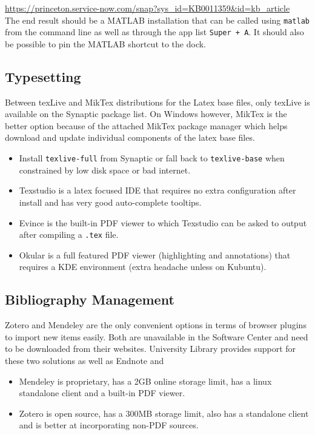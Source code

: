 \documentclass[10pt,letterpaper,twocolumn]{article}
\begin{document}
\url{https://princeton.service-now.com/snap?sys_id=KB0011359&id=kb_article}\\

The end result should be a MATLAB installation that can be called using \texttt{matlab} from the command line as well as through the app list \texttt{Super + A}. It should also be possible to pin the MATLAB shortcut to the dock.

\subsection{Typesetting}

Between texLive and MikTex distributions for the Latex base files, only texLive is available on the Synaptic package list. On Windows however, MikTex is the better option because of the attached MikTex package manager which helps download and update individual components of the latex base files.

\begin{itemize}
	\item Install \texttt{texlive-full} from Synaptic or fall back to \texttt{texlive-base} when constrained by low disk space or bad internet.
	\item Texstudio is a latex focused IDE that requires no extra configuration after install and has very good auto-complete tooltips.
	\item Evince is the built-in PDF viewer to which Texstudio can be asked to output after compiling a \texttt{.tex} file. 
	\item Okular is a full featured PDF viewer (highlighting and annotations) that requires a KDE environment (extra headache unless on Kubuntu).
\end{itemize} 


\subsection{Bibliography Management}

Zotero and Mendeley are the only convenient options in terms of browser plugins to import new items easily. Both are unavailable in the Software Center and need to be downloaded from their websites. University Library provides support for these two solutions as well as Endnote and 

\begin{itemize}
	\item Mendeley is proprietary, has a 2GB online storage limit, has a linux standalone client and a built-in PDF viewer.
	\item Zotero is open source, has a 300MB storage limit, also has a standalone client and is better at incorporating non-PDF sources.
\end{itemize}
\end{document}
